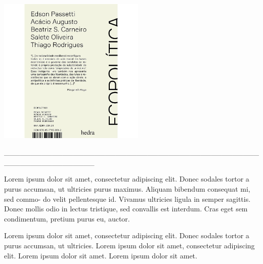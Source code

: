 \hspace{.5cm}

\begin{center}
\hspace*{-1cm}
\hspace{1cm}\includegraphics[width=70mm]{eco.jpeg}
\end{center}

\hspace*{-2cm}\_\_\_\_\_\_\_\_\_\_\_\_\_\_\_\_\_\_\_\_\_\_\_\_\_\_\_\_\_\_\_\_\_\_\_\_\_\_\_\_\_\_\_\_\_\_\_\_\_\_\_\_\_\_\_\_\_\_\_\_\_\_\_\_\_

\noindent{}Lorem ipsum dolor sit amet, consectetur adipiscing elit.
Donec sodales tortor a purus accumsan, ut ultricies purus
maximus. Aliquam bibendum consequat mi, sed commo-
do velit pellentesque id. Vivamus ultricies ligula in semper
sagittis. Donec mollis odio in lectus tristique, sed convallis
est interdum. Cras eget sem condimentum, pretium purus
eu, auctor.

\hspace{.5cm}

\hspace*{-.4cm}\begin{minipage}[c]{0.45\linewidth}
\small{
{}}
\end{minipage}
\begin{minipage}[c]{0.50\linewidth}
\small{Lorem ipsum dolor sit amet, consectetur adipiscing elit.
Donec sodales tortor a purus accumsan, ut ultricies. Lorem ipsum dolor sit amet, consectetur adipiscing elit. Lorem ipsum dolor sit amet. Lorem ipsum dolor sit amet.} 
\end{minipage}

